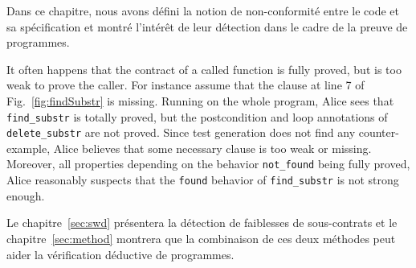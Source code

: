 Dans ce chapitre, nous avons défini la notion de non-conformité entre le code
et sa spécification et montré l'intérêt de leur détection dans le cadre de la
preuve de programmes.


It often happens that the contract of a called function is
fully proved, but is too weak to prove the caller.
For instance assume that the clause at line 7 of Fig.~\ref{fig:findSubstr} is
missing. Running \Wp on the whole program, Alice sees that
\lstinline{find_substr} is totally proved, but the postcondition and loop
annotations of \lstinline{delete_substr} are not proved. Since test generation
does not find any counter-example, Alice believes that some necessary clause is
too weak or missing.
Moreover, all properties depending on the behavior \lstinline{not_found} being
fully proved, Alice reasonably suspects that the \lstinline{found} behavior of
\lstinline{find_substr} is not strong enough.


Le chapitre~\ref{sec:swd} présentera la détection de faiblesses de sous-contrats
et le chapitre~\ref{sec:method} montrera que la combinaison de ces deux méthodes
peut aider la vérification déductive de programmes.
